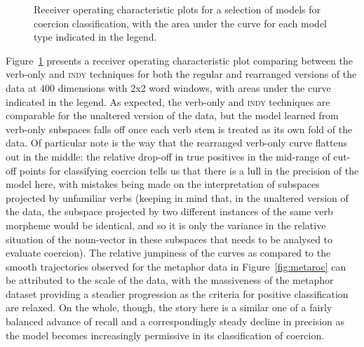 \begin{figure}
\caption[Receiver Operating Characterisation for Coercion Classification]{Receiver operating characteristic plots for a selection of models for coercion classification, with the area under the curve for each model type indicated in the legend.}
\label{fig:coerroc}
\end{figure}

Figure~\ref{fig:coerroc} presents a receiver operating characteristic plot comparing between the verb-only and \textsc{indy} techniques for both the regular and rearranged versions of the data at 400 dimensions with 2x2 word windows, with areas under the curve indicated in the legend.  As expected, the verb-only and \textsc{indy} techniques are comparable for the unaltered version of the data, but the model learned from verb-only subspaces falls off once each verb stem is treated as its own fold of the data.  Of particular note is the way that the rearranged verb-only curve flattens out in the middle: the relative drop-off in true positives in the mid-range of cut-off points for classifying coercion tells us that there is a lull in the precision of the model here, with mistakes being made on the interpretation of subspaces projected by unfamiliar verbs (keeping in mind that, in the unaltered version of the data, the subspace projected by two different instances of the same verb morpheme would be identical, and so it is only the variance in the relative situation of the noun-vector in these subspaces that needs to be analysed to evaluate coercion).  The relative jumpiness of the curves as compared to the smooth trajectories observed for the metaphor data in Figure~\ref{fig:metaroc} can be attributed to the scale of the data, with the massiveness of the metaphor dataset providing a steadier progression as the criteria for positive classification are relaxed.  On the whole, though, the story here is a similar one of a fairly balanced advance of recall and a correspondingly steady decline in precision as the model becomes increasingly permissive in its classification of coercion.

